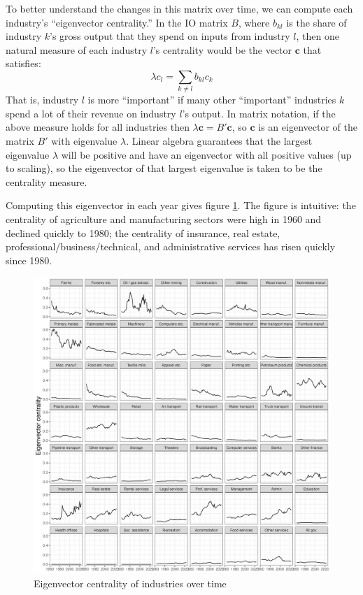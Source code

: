 \documentclass[12pt]{article}
\begin{document}
To better understand the changes in this matrix over time, we can compute each industry's ``eigenvector centrality.'' In the IO matrix $B$, where $b_{kl}$ is the share of industry $k$'s gross output that they spend on inputs from industry $l$, then one natural measure of each industry $l$'s centrality would be the vector $\mathbf c$ that satisfies:
\[
\lambda c_l = \sum_{k\neq l} b_{kl} c_k
\]
That is, industry $l$ is more ``important'' if many other ``important'' industries $k$ spend a lot of their revenue on industry $l$'s output. In matrix notation, if the above measure holds for all industries then $\lambda\mathbf c = B' \mathbf c$, so $\mathbf c$ is an eigenvector of the matrix $B'$ with eigenvalue $\lambda$. Linear algebra guarantees that the largest eigenvalue $\lambda$ will be positive and have an eigenvector with all positive values (up to scaling), so the eigenvector of that largest eigenvalue is taken to be the centrality measure.

Computing this eigenvector in each year gives figure \ref{eigcent}. The figure is intuitive: the centrality of agriculture and manufacturing sectors were high in 1960 and declined quickly to 1980; the centrality of insurance, real estate, professional/business/technical, and administrative services has risen quickly since 1980.

\begin{figure}\caption{Eigenvector centrality of industries over time}\label{eigcent}
    \includegraphics[width=\textwidth]{../figures/exploration/IO-matrices/industry_eigenvectors.png}
\end{figure}
\end{document}
